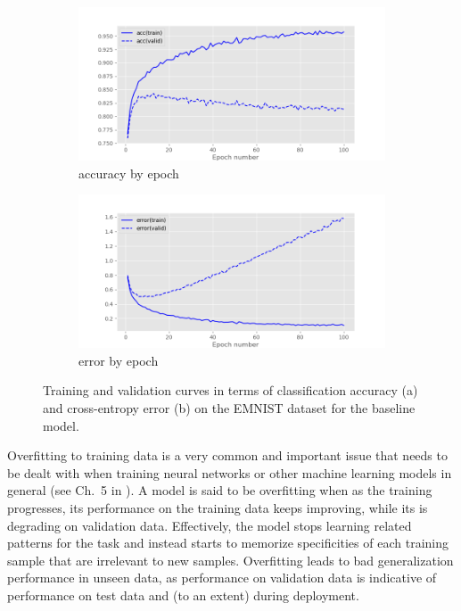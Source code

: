 \documentclass{article}
\begin{document}
\begin{figure}[t]
    \centering
    \begin{subfigure}{\linewidth}
        \includegraphics[width=\linewidth]{figures/fig1_acc.png}
        \caption{accuracy by epoch}
        \label{fig:example_acccurves}
    \end{subfigure} 
    \begin{subfigure}{\linewidth}
        \centering
        \includegraphics[width=\linewidth]{figures/fig1_err.png}
        \caption{error by epoch}
        \label{fig:example_errorcurves}
    \end{subfigure} 
    \caption{Training and validation curves in terms of classification accuracy (a) and cross-entropy error (b) on the EMNIST dataset for the baseline model.}
    \label{fig:example}
\end{figure} 

Overfitting to training data is a very common and important issue that needs to be dealt with when training neural networks or other machine learning models in general (see Ch.~5 in \citealt{Goodfellow-et-al-2016}).
A model is said to be overfitting when as the training progresses, its performance on the training data keeps improving, while its is degrading on validation data. 
Effectively, the model stops learning related patterns for the task and instead starts to memorize specificities of each training sample that are irrelevant to new samples. 
Overfitting leads to bad generalization performance in unseen data, as performance on validation data is indicative of performance on test data and (to an extent) during deployment.
\end{document}
